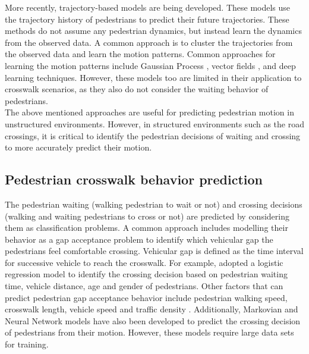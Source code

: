 \documentclass[letter,journal]{IEEEtran}
\begin{document}
More recently, trajectory-based models are being developed. These models use the trajectory history of pedestrians to predict their future trajectories. These methods do not assume any pedestrian dynamics, but instead learn the dynamics from the observed data. A common approach is to cluster the trajectories from the observed data and learn the motion patterns. Common approaches for learning the motion patterns include Gaussian Process \cite{ellis2009modelling,jaipuria2018learning}, vector fields \cite{coscia2018long,jacobs2017real}, and deep learning \cite{alahi2016social} techniques. However, these models too are limited in their application to crosswalk scenarios, as they also do not consider the waiting behavior of pedestrians.\\

The above mentioned approaches are useful for predicting pedestrian motion in unstructured environments. However, in structured environments such as the road crossings, it is critical to identify the pedestrian decisions of waiting and crossing to more accurately predict their motion. 



\subsection{Pedestrian crosswalk behavior prediction}

The pedestrian waiting (walking pedestrian to wait or not) and crossing decisions (walking and waiting pedestrians to cross or not) are predicted by considering them as classification problems. A common approach includes modelling their behavior as a gap acceptance problem to identify which vehicular gap the pedestrians feel comfortable crossing. Vehicular gap is defined as the time interval for successive vehicle to reach the crosswalk. For example, \cite{yannis2013pedestrian} adopted a logistic regression model to identify the crossing decision based on pedestrian waiting time, vehicle distance, age and gender of pedestrians. Other factors that can predict pedestrian gap acceptance behavior include pedestrian walking speed, crosswalk length, vehicle speed and traffic density \cite{papadimitriou2009critical}. Additionally, Markovian and Neural Network models have also been developed to predict the crossing decision of pedestrians \cite{koehler2013stationary,quintero2017pedestrian} from their motion. However, these models require large data sets for training. \\
\end{document}
